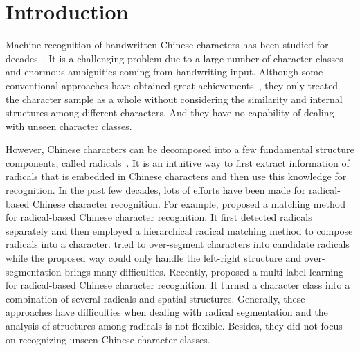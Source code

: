 \documentclass[a4paper,conference]{IEEEtran}
\begin{document}

\IEEEpeerreviewmaketitle



\section{Introduction}
\label{sec:Introduction}
Machine recognition of handwritten Chinese characters has been studied for decades~\cite{suen1980automatic}. It is a challenging problem due to a large number of character classes and enormous ambiguities coming from handwriting input. Although some conventional approaches have obtained great achievements~\cite{plamondon2000online,liu2004online,zhang2017drawing,yang2016dropsample,zhong2015high}, they only treated the character sample as a whole without considering the similarity and internal structures among different characters. And they have no capability of dealing with unseen character classes.

However, Chinese characters can be decomposed into a few fundamental structure components, called radicals~\cite{chang1973interactive}. It is an intuitive way to first extract information of radicals that is embedded in Chinese characters and then use this knowledge for recognition. In the past few decades, lots of efforts have been made for radical-based Chinese character recognition. For example, \cite{wang2001optical} proposed a matching method for radical-based Chinese character recognition. It first detected radicals separately and then employed a hierarchical radical matching method to compose radicals into a character. \cite{ma2008new} tried to over-segment characters into candidate radicals while the proposed way could only handle the left-right structure and over-segmentation brings many difficulties. Recently, \cite{wang2017label} proposed a multi-label learning for radical-based Chinese character recognition. It turned a character class into a combination of several radicals and spatial structures. Generally, these approaches have difficulties when dealing with radical segmentation and the analysis of structures among radicals is not flexible. Besides, they did not focus on recognizing unseen Chinese character classes.
\end{document}
